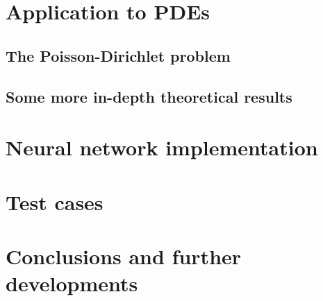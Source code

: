 \documentclass[12pt, a4paper]{report}
\theoremstyle{definition}
\begin{document}


\chapter{Application to PDEs}\label{chapter2}

\section{The Poisson-Dirichlet problem}\label{section2.1}

\section{Some more in-depth theoretical results}\label{section2.2}




\chapter{Neural network implementation}\label{chapter3}



\chapter{Test cases}\label{chapter4}



\chapter*{Conclusions and further developments}

\end{document}
